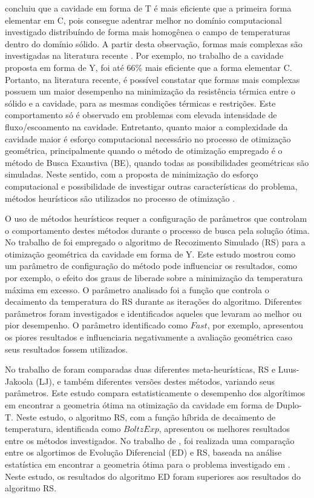 \documentclass[12pt,A4,A4pt]{article}
\begin{document}
 concluiu que a cavidade em forma de T é mais eficiente que a primeira forma elementar em C, pois consegue adentrar melhor no domínio computacional investigado distribuíndo de forma mais homogênea o campo de temperaturas dentro do domínio sólido. A partir desta observação, formas mais complexas são investigadas na literatura recente \cite{Biserni2007,Lorenzini2011,Lorenzini2014,Biserni2017,Xie2010}. Por exemplo, no trabalho de  a cavidade proposta em forma de Y, foi até 66\% mais eficiente que a forma elementar C. Portanto, na literatura recente, é possível constatar que formas mais complexas possuem um maior desempenho na minimização da resistência térmica entre o sólido e a cavidade, para as mesmas condições térmicas e restrições. Este comportamento só é observado em problemas com elevada intensidade de fluxo/escoamento na cavidade. Entretanto, quanto maior a complexidade da cavidade maior é esforço computacional necessário no processo de otimização geométrica, principalmente quando o método de otimização empregado é o método de Busca Exaustiva (BE), quando todas as possibilidades geométricas são simuladas. Neste sentido, com a proposta de minimização do esforço computacional e possibilidade de investigar outras características do problema, métodos heurísticos são utilizados no processo de otimização \cite{Lorenzini2014,Gonzales2015energy,Gonzales2017,Biserni2017}.

O uso de métodos heurísticos requer a configuração de parâmetros que controlam o comportamento destes métodos durante o processo de busca pela solução ótima. No trabalho de  foi empregado o algoritmo de Recozimento Simulado (RS) para a otimização geométrica da cavidade em forma de Y. Este estudo mostrou como um parâmetro de configuração do método pode influenciar os resultados, como por exemplo, o efeito dos graus de liberade sobre a minimização da temperatura máxima em excesso. O parâmetro analisado foi a função que controla o decaimento da temperatura do RS durante as iterações do algoritmo. Diferentes parâmetros foram investigados e identificados aqueles que levaram ao melhor ou pior desempenho. O parâmetro identificado como $Fast$, por exemplo, apresentou os piores resultados e influenciaria negativamente a avaliação geométrica caso seus resultados fossem utilizados. 

No trabalho de \cite{Gonzales2017} foram comparadas duas diferentes meta-heurísticas, RS e Luus-Jakoola (LJ), e também diferentes versões destes métodos, variando seus parâmetros. Este estudo compara estatisticamente o desempenho dos algorítimos em encontrar a geometria ótima na otimização da cavidade em forma de Duplo-T. Neste estudo, o algoritmo RS, com a função híbrida de decaimento de temperatura, identificada como $BoltzExp$, apresentou os melhores resultados entre os métodos investigados. No trabalho de , foi realizada uma comparação entre os algortimos de Evolução Diferencial (ED) e RS, baseada na análise estatística em encontrar a geometria ótima para o problema investigado em . Neste estudo, os resultados do algoritmo ED foram superiores aos resultados do algoritmo RS.
\end{document}
